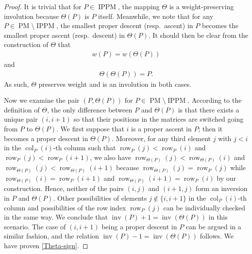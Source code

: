 \documentclass[12pt,reqno]{amsart}
\numberwithin{equation}{section}
\theoremstyle{theorem}
\theoremstyle{definition}
\theoremstyle{named}
\newcommand{\MatP}{\operatorname{PM}}
\newcommand{\col}{\operatorname{col}}
\newcommand{\row}{\operatorname{row}}
\newcommand{\inv}{\operatorname{inv}}
\newcommand{\IPPM}{\operatorname{IPPM}}
\begin{document}
\begin{proof}
	It is trivial that for $P\in \IPPM$, the mapping $\Theta$ is a weight-preserving involution because $\Theta(P)$ is $P$ itself. Meanwhile, we note that for any $P\in\MatP\setminus\IPPM$, the smallest proper descent (resp.~ascent) in $P$ becomes the smallest proper ascent (resp.~descent) in $\Theta(P)$. It should then be clear from the construction of $\Theta$ that
	\begin{align*}
		w(P)=w(\Theta(P))
	\end{align*}
	and
	\begin{align*}
		\Theta(\Theta(P))=P.
	\end{align*}
	As such, $\Theta$ preserves weight and is an involution in both cases.
	
	Now we examine the pair $(P,\Theta(P))$ for $P\in\MatP\setminus\IPPM$. According to the definition of $\Theta$, the only difference between $P$ and $\Theta(P)$ is that there exists a unique pair $(i,i+1)$ so that their positions in the matrices are switched going from $P$ to $\Theta(P)$. We first suppose that $i$ is a proper ascent in $P$; then it becomes a proper descent in $\Theta(P)$. Moreover, for any third element $j$ with $j<i$ in the $\col_P(i)$-th column such that $\row_P(j)<\row_P(i)$ and $\row_P(j)<\row_P(i+1)$, we also have $\row_{\Theta(P)}(j) < \row_{\Theta(P)}(i)$ and $\row_{\Theta(P)}(j) < \row_{\Theta(P)}(i+1)$ because $\row_{\Theta(P)}(j) = \row_{P}(j)$ while $\row_{\Theta(P)}(i) = \row_P(i+1)$ and $\row_{\Theta(P)}(i+1) = \row_P(i)$ by our construction. Hence, neither of the pairs $(i,j)$ and $(i+1,j)$ form an inversion in $P$ and $\Theta(P)$. Other possibilities of elements $j\not\in \{i,i+1\}$ in the $\col_P(i)$-th column and possibilities of the row index $\row_P(j)$ can be individually checked in the same way. We conclude that $\inv(P)+1=\inv(\Theta(P))$ in this scenario. The case of $(i,i+1)$ being a proper descent in $P$ can be argued in a similar fashion, and the relation $\inv(P)-1=\inv(\Theta(P))$ follows. We have proven \eqref{Theta-sign}.
	

\end{proof}
\end{document}
